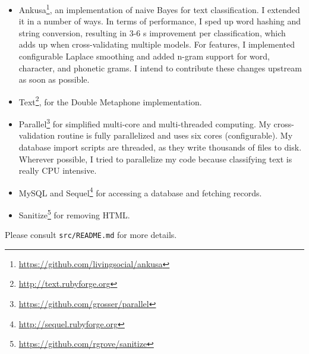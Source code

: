 \documentclass[10pt]{article}
\begin{document}
\begin{itemize}
\item Ankusa\footnote{\url{https://github.com/livingsocial/ankusa}}, an
  implementation of naive Bayes for text classification. I extended it in a
  number of ways. In terms of performance, I sped up word hashing and string
  conversion, resulting in 3-6 s improvement per classification, which adds up when
  cross-validating multiple models. For features, I implemented configurable
  Laplace smoothing and added n-gram support for word, character, and phonetic
  grams. I intend to contribute these changes upstream as soon as possible.
\item Text\footnote{\url{http://text.rubyforge.org}}, for the Double Metaphone
  implementation.
\item Parallel\footnote{\url{https://github.com/grosser/parallel}} for
  simplified multi-core and multi-threaded computing. My cross-validation
  routine is fully parallelized and uses six cores (configurable). My database
  import scripts are threaded, as they write thousands of files to disk.
  Wherever possible, I tried to parallelize my code because classifying text
  is really CPU intensive.
\item MySQL and Sequel\footnote{\url{http://sequel.rubyforge.org}} for
  accessing a database and fetching records.
\item Sanitize\footnote{\url{https://github.com/rgrove/sanitize}} for removing
  HTML.
\end{itemize}

Please consult
\texttt{src/README.md} for more details.



\end{document}
